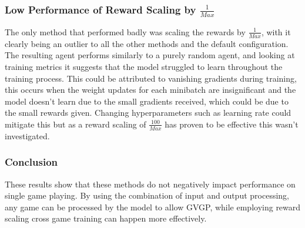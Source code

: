 \subsubsection{Low Performance of Reward Scaling by $\frac{1}{Max}$}
The only method that performed badly was scaling the rewards by $\frac{1}{Max}$, with it clearly being an outlier to all the other methods and the default configuration.
The resulting agent performs similarly to a purely random agent, and looking at training metrics it suggests that the model struggled to learn throughout the training process.
This could be attributed to vanishing gradients during training, this occurs when the weight updates for each minibatch are insignificant and the model doesn't learn due to the small gradients received, which could be due to the small rewards given.
Changing hyperparameters such as learning rate could mitigate this but as a reward scaling of $\frac{100}{Max}$ has proven to be effective this wasn't investigated.
\subsubsection{Conclusion}
These results show that these methods do not negatively impact performance on single game playing.
By using the combination of input and output processing, any game can be processed by the model to allow GVGP, while employing reward scaling cross game training can happen more effectively.
